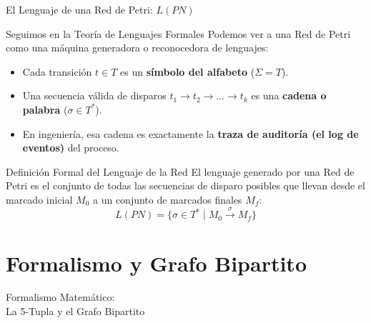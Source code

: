 \documentclass[10pt, aspectratio=169]{beamer}
\begin{document}
\begin{frame}{El Lenguaje de una Red de Petri: $L(PN)$}
	\begin{block}{Seguimos en la Teoría de Lenguajes Formales}
		Podemos ver a una Red de Petri como una máquina generadora o reconocedora de lenguajes:
		\begin{itemize}
			\item Cada transición $t \in T$ es un \textbf{símbolo del alfabeto} ($\Sigma = T$).
			\item Una secuencia válida de disparos $t_1 \to t_2 \to \dots \to t_k$ es una \textbf{cadena o palabra} ($\sigma \in T^*$).
			\item En ingeniería, esa cadena es exactamente la \textbf{traza de auditoría (el log de eventos)} del proceso.
		\end{itemize}
	\end{block}

	\begin{alertblock}{Definición Formal del Lenguaje de la Red}
		El lenguaje generado por una Red de Petri es el conjunto de todas las secuencias de disparo posibles que llevan desde el marcado inicial $M_0$ a un conjunto de marcados finales $M_f$:
		\[ L(PN) = \{ \sigma \in T^* \mid M_0 \xrightarrow{\sigma} M_f \} \]
	\end{alertblock}
\end{frame}

\section{Formalismo y Grafo Bipartito}

\begin{frame}{}
	\centering
	\Huge{Formalismo Matemático: \\ La 5-Tupla y el Grafo Bipartito}
\end{frame}
\end{document}
